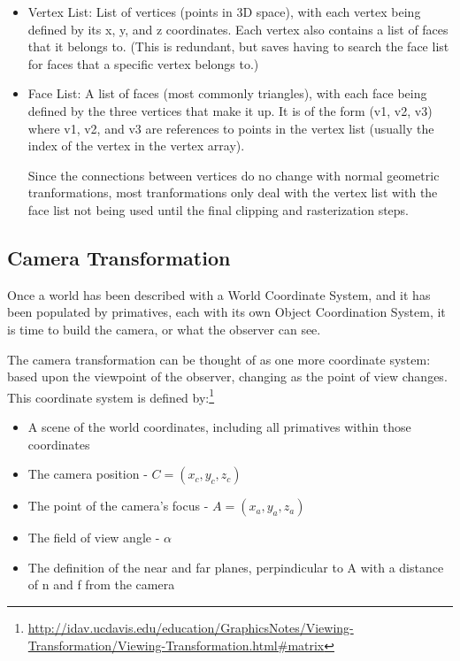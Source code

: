 \documentclass{article}
\begin{document}
\begin{itemize}
\item{Vertex List:
List of vertices (points in 3D space), with each vertex being defined by its x, y, and z coordinates. Each vertex also contains a list of faces that it belongs to. (This is redundant, but saves having to search the face list for faces that a specific vertex belongs to.)}

\item{Face List:
A list of faces (most commonly triangles), with each face being defined by the three vertices that make it up. It is of the form (v1, v2, v3) where v1, v2, and v3 are references to points in the vertex list (usually the index of the vertex in the vertex array).

Since the connections between vertices do no change with normal geometric tranformations, most tranformations only deal with the vertex list with the face list not being used until the final clipping and rasterization steps.}
\end{itemize}

\subsection{Camera Transformation}
Once a world has been described with a World Coordinate System, and it has been populated by primatives, each with its own Object Coordination System, it is time to build the camera, or what the observer can see.

The camera transformation can be thought of as one more coordinate system: based upon the viewpoint of the observer, changing as the point of view changes. This coordinate system is defined  by:\footnote{\url{http://idav.ucdavis.edu/education/GraphicsNotes/Viewing-Transformation/Viewing-Transformation.html\#matrix}}

\begin{itemize}
\item A scene of the world coordinates, including all primatives within those coordinates
\item The camera position - $C = (x_{c}, y_{c}, z_{c})$
\item The point of the camera's focus - $A = (x_{a}, y_{a}, z_{a})$
\item The field of view angle - $\alpha$
\item The definition of the near and far planes, perpindicular to A with a distance of n and f from the camera
\end{itemize}
\end{document}
